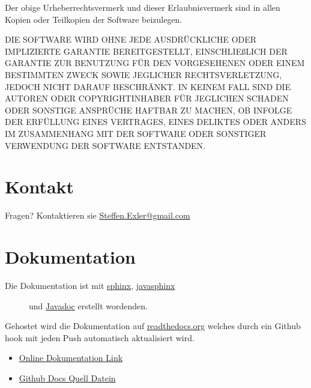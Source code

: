 \documentclass[letterpaper,10pt,ngerman]{sphinxmanual}
\begin{document}
Der obige Urheberrechtsvermerk und dieser Erlaubnisvermerk sind in allen Kopien oder Teilkopien der Software beizulegen.

DIE SOFTWARE WIRD OHNE JEDE AUSDRÜCKLICHE ODER IMPLIZIERTE GARANTIE BEREITGESTELLT, EINSCHLIEßLICH DER GARANTIE ZUR BENUTZUNG FÜR DEN VORGESEHENEN ODER EINEM BESTIMMTEN ZWECK SOWIE JEGLICHER RECHTSVERLETZUNG, JEDOCH NICHT DARAUF BESCHRÄNKT. IN KEINEM FALL SIND DIE AUTOREN ODER COPYRIGHTINHABER FÜR JEGLICHEN SCHADEN ODER SONSTIGE ANSPRÜCHE HAFTBAR ZU MACHEN, OB INFOLGE DER ERFÜLLUNG EINES VERTRAGES, EINES DELIKTES ODER ANDERS IM ZUSAMMENHANG MIT DER SOFTWARE ODER SONSTIGER VERWENDUNG DER SOFTWARE ENTSTANDEN.


\section{Kontakt}
\label{license:kontakt}
Fragen? Kontaktieren sie \href{mailto:Steffen.Exler@gmail.com}{Steffen.Exler@gmail.com}


\section{Dokumentation}
\label{docs::doc}\label{docs:dokumentation}
\begin{description}
\item[{Die Dokumentation ist mit \href{http://www.sphinx-doc.org/en/1.4.8/}{sphinx}, \href{https://bronto.github.io/javasphinx/}{javasphinx}}] \leavevmode
und \href{https://en.wikipedia.org/wiki/Javadoc}{Javadoc}  erstellt wordenden.

\end{description}

Gehostet wird die Dokumentation auf \href{https://readthedocs.org/}{readthedocs.org} welches durch ein Github hook mit jeden Push automatisch aktualisiert wird.
\begin{itemize}
\item {} 
\href{https://readthedocs.org/projects/polynomials-calculator/}{Online Dokumentation Link}

\item {} 
\href{https://github.com/linuxluigi/polynomials-calculator/tree/master/docs}{Github Docs Quell Datein}

\end{itemize}
\end{document}

